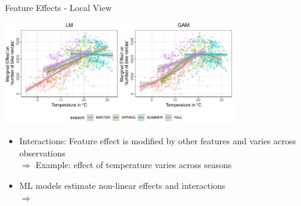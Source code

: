 \documentclass[11pt,compress,t,notes=noshow, aspectratio=169, xcolor=table]{beamer}
\begin{document}
\begin{frame}{Feature Effects - Local View}

\centerline{\includegraphics[width=0.75\textwidth, trim=0cm 0.1cm 0cm 0cm, clip]{figure/lm_main_interactions}}

\begin{itemize}
    \item Interactions: Feature effect is modified by other features and varies across observations \\ 
    $\Rightarrow$ Example: effect of temperature varies across seasons
    \item ML models estimate non-linear effects and interactions \\
    $\Rightarrow$
\end{itemize}




\end{frame}

%
%
%
%
%
%
\end{document}
